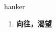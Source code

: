 
\begin{frame}
{\huge hanker}
\begin{center}
\begin{enumerate}\Large
  \item \textbf{向往，渴望}
\end{enumerate}
\end{center}
\end{frame}

